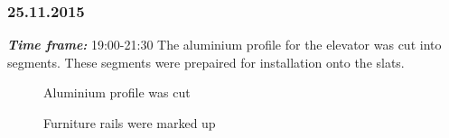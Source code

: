 \subsubsection{25.11.2015}
\textit{\textbf{Time frame:}} 19:00-21:30 \newline
The aluminium profile for the elevator was cut into segments. These segments were prepaired for installation onto the slats.

\begin{figure}[H]
	\begin{minipage}[h]{0.47\linewidth}
		\caption{Aluminium profile was cut}
	\end{minipage}
	\hfill
	\begin{minipage}[h]{0.47\linewidth}
		\caption{Furniture rails were marked up}
	\end{minipage}
\end{figure}

